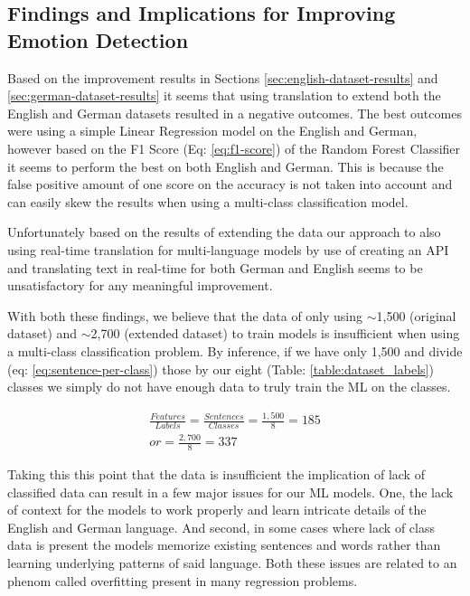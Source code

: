 \documentclass[11pt]{article}
\begin{document}
\subsection{Findings and Implications for Improving Emotion Detection}
Based on the improvement results in Sections \ref{sec:english-dataset-results} and \ref{sec:german-dataset-results} it seems that using translation to extend both the English and German datasets resulted in a negative outcomes. The best outcomes were using a simple Linear Regression model on the English and German, however based on the F1 Score (Eq: \ref{eq:f1-score}) of the Random Forest Classifier it seems to perform the best on both English and German. This is because the false positive amount of one score on the accuracy is not taken into account and can easily skew the results when using a multi-class classification model.

Unfortunately based on the results of extending the data our approach to also using real-time translation for multi-language models by use of creating an API and translating text in real-time for both German and English seems to be unsatisfactory for any meaningful improvement.

With both these findings, we believe that the data of only using $\sim$1,500 (original dataset) and $\sim$2,700 (extended dataset) to train models is insufficient\cite{overfitting-overview} when using a multi-class classification problem. By inference, if we have only 1,500 and divide (eq: \ref{eq:sentence-per-class}) those by our eight (Table: \ref{table:dataset_labels}) classes we simply do not have enough data to truly train the ML on the classes.

\begin{equation}
\begin{split}
\frac{Features}{Labels}= \frac{Sentences}{Classes}=\frac{1,500}{8}=185 \\
or=\frac{2,700}{8}=337
\end{split}
\label{eq:sentence-per-class}
\end{equation}

Taking this this point that the data is insufficient the implication of lack of classified data can result in a few major issues for our ML models. One, the lack of context for the models to work properly and learn intricate details of the English and German language. And second, in some cases where lack of class data is present the models memorize existing sentences and words rather than learning underlying patterns of said language. Both these issues are related to an phenom called overfitting\cite{overfitting-overview} present in many regression problems.
\end{document}
